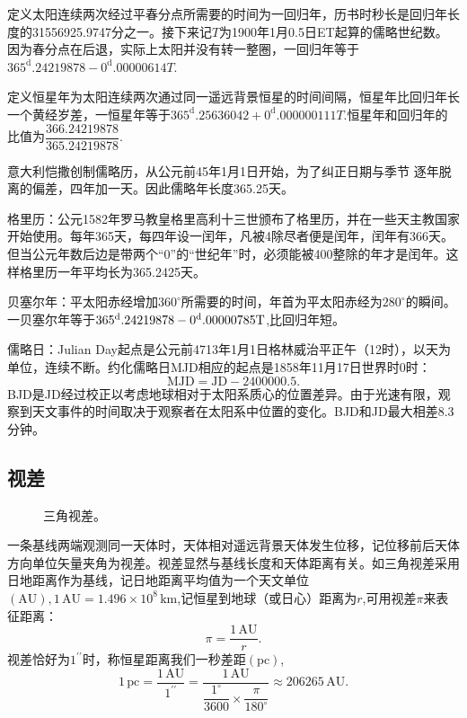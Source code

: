 \documentclass[11pt, a4paper, oneside]{ctexart}
\numberwithin{equation}{subsection}
\begin{document}
定义太阳连续两次经过平春分点所需要的时间为一回归年，历书时秒长是回归年长度的31556925.9747分之一。接下来记$T$为1900年1月0.5日ET起算的儒略世纪数。因为春分点在后退，实际上太阳并没有转一整圈，一回归年等于$365^\mathrm{d}.24219878-0^\mathrm{d}.00000614T$.

定义恒星年为太阳连续两次通过同一遥远背景恒星的时间间隔，恒星年比回归年长一个黄经岁差，一恒星年等于$365^\mathrm{d}.25636042+0^\mathrm{d}.000000111T$.恒星年和回归年的比值为$\dfrac{366.24219878}{365.24219878}$.

意大利恺撒创制儒略历，从公元前45年1月1日开始，为了纠正日期与季节
逐年脱离的偏差，四年加一天。因此儒略年长度365.25天。

格里历：公元1582年罗马教皇格里高利十三世颁布了格里历，并在一些天主教国家开始使用。每年365天，每四年设一闰年，凡被4除尽者便是闰年，闰年有366天。但当公元年数后边是带两个“0”的“世纪年”时，必须能被400整除的年才是闰年。这样格里历一年平均长为365.2425天。

贝塞尔年：平太阳赤经增加$360^\circ$所需要的时间，年首为平太阳赤经为$280^\circ$的瞬间。一贝塞尔年等于$\rm 365^\mathrm{d}.24219878-0^\mathrm{d}.00000785T$,比回归年短。

儒略日：Julian Day起点是公元前4713年1月1日格林威治平正午（12时），以天为单位，连续不断。约化儒略日MJD相应的起点是1858年11月17日世界时0时：
\begin{equation}
\text{MJD}=\text{JD}-2400000.5.
\end{equation}
BJD是JD经过校正以考虑地球相对于太阳系质心的位置差异。由于光速有限，观察到天文事件的时间取决于观察者在太阳系中位置的变化。BJD和JD最大相差8.3分钟。

\subsection{视差}
\begin{figure}[!htp]
\centering
{}
\captionsetup{justification=raggedright, singlelinecheck=false}
\caption{三角视差。}
\label{三角视差。}
\end{figure}

一条基线两端观测同一天体时，天体相对遥远背景天体发生位移，记位移前后天体方向单位矢量夹角为视差。视差显然与基线长度和天体距离有关。如三角视差采用日地距离作为基线，记日地距离平均值为一个天文单位$(\mathrm{AU}),1\,\mathrm{AU}=1.496\times10^{8}\,\mathrm{km}$,记恒星到地球（或日心）距离为$r$,可用视差$\pi$来表征距离：
\begin{equation}
\pi=\frac{1\,\mathrm{AU}}{r}.
\end{equation}
视差恰好为$1^{\prime\prime}$时，称恒星距离我们一秒差距$(\mathrm{pc})$,
\begin{equation}
1\,\mathrm{pc}=\frac{1\,\mathrm{AU}}{1^{\prime\prime}}=\frac{1\,\mathrm{AU}}{\dfrac{1^{\circ}}{3600}\times\dfrac{\pi}{180^{\circ}}}\approx206265\,\mathrm{AU}.
\end{equation}
\end{document}
